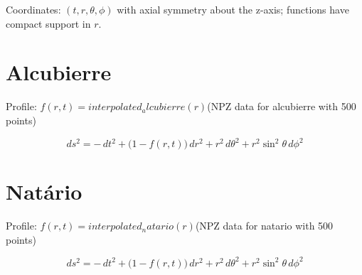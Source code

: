 \documentclass{article}
\begin{document}
Coordinates: $(t, r, \theta, \phi)$ with axial symmetry about the z-axis; functions have compact support in $r$.

\section*{Alcubierre}
Profile: $f(r,t) = interpolated_alcubierre(r)$\quad (NPZ data for alcubierre with 500 points)

\[ds^2 = -\,dt^2 + \bigl(1 - f(r,t)\bigr)\,dr^2 + r^2\,d\theta^2 + r^2\sin^2\theta\,d\phi^2\]

\section*{Natário}
Profile: $f(r,t) = interpolated_natario(r)$\quad (NPZ data for natario with 500 points)

\[ds^2 = -\,dt^2 + \bigl(1 - f(r,t)\bigr)\,dr^2 + r^2\,d\theta^2 + r^2\sin^2\theta\,d\phi^2\]
\end{document}
